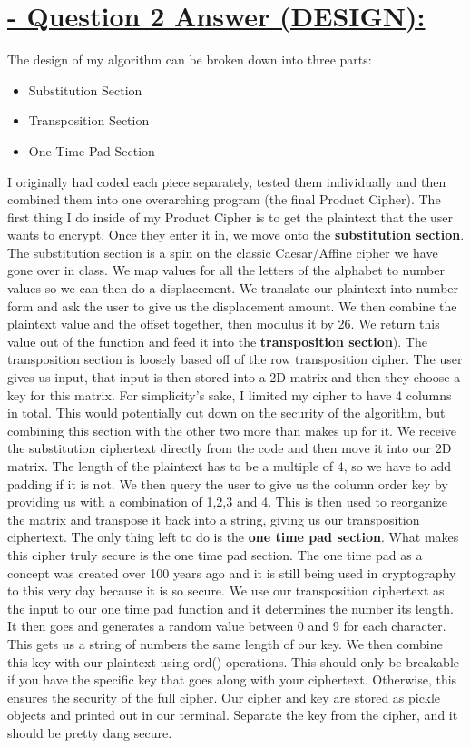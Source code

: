 \documentclass{article}
\begin{document}
\section{\underline{ - Question 2 Answer (DESIGN):}}
The design of my algorithm can be broken down into three parts: 

\begin{itemize}
	\item Substitution Section
	\item Transposition Section
	\item One Time Pad Section
\end{itemize}
I originally had coded each piece separately, tested them individually and then combined them into one overarching program (the final Product Cipher).
The first thing I do inside of my Product Cipher is to get the plaintext that the user wants to encrypt. Once they enter it in, we move onto the \textbf{substitution section}. 
The substitution section is a spin on the classic Caesar/Affine cipher we have gone over in class. We map values for all the letters of the alphabet to number values so we can then do a displacement. We translate our plaintext into number form and ask the user to give us the displacement amount. We then combine the plaintext value and the offset together, then modulus it by 26. We return this value out of the function and feed it into the \textbf{transposition section}). \newline
The transposition section is loosely based off of the row transposition cipher. The user gives us input, that input is then stored into a 2D matrix and then they choose a key for this matrix. For simplicity's sake, I limited my cipher to have 4 columns in total. This would potentially cut down on the security of the algorithm, but combining this section with the other two more than makes up for it. We receive the substitution ciphertext directly from the code and then move it into our 2D matrix. The length of the plaintext has to be a multiple of 4, so we have to add padding if it is not. We then query the user to give us the column order key by providing us with a combination of 1,2,3 and 4. This is then used to reorganize the matrix and transpose it back into a string, giving us our transposition ciphertext. The only thing left to do is the \textbf{one time pad section}.\newline
What makes this cipher truly secure is the one time pad section. The one time pad as a concept was created over 100 years ago and it is still being used in cryptography to this very day because it is so secure. We use our transposition ciphertext as the input to our one time pad function and it determines the number its length. It then goes and generates a random value between 0 and 9 for each character. This gets us a string of numbers the same length of our key. We then combine this key with our plaintext using ord() operations. This should only be breakable if you have the specific key that goes along with your ciphertext. Otherwise, this ensures the security of the full cipher. Our cipher and key are stored as pickle objects and printed out in our terminal. Separate the key from the cipher, and it should be pretty dang secure. \newline
\end{document}
